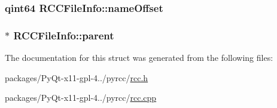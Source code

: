 \subsubsection[{name\+Offset}]{\setlength{\rightskip}{0pt plus 5cm}qint64 R\+C\+C\+File\+Info\+::name\+Offset}\label{structRCCFileInfo_ad7fee8ec6ccffe63604eff53ac9fa792}
\hypertarget{structRCCFileInfo_a7166e4c752fd8c2717850f7e230768dc}{}
\subsubsection[{parent}]{$\ast$ R\+C\+C\+File\+Info\+::parent}\label{structRCCFileInfo_a7166e4c752fd8c2717850f7e230768dc}


The documentation for this struct was generated from the following files\+:\begin{DoxyCompactItemize}
\item 
packages/\+Py\+Qt-\/x11-\/gpl-\/4../pyrcc/\hyperlink{rcc_8h}{rcc.\+h}\item 
packages/\+Py\+Qt-\/x11-\/gpl-\/4../pyrcc/\hyperlink{rcc_8cpp}{rcc.\+cpp}\end{DoxyCompactItemize}
